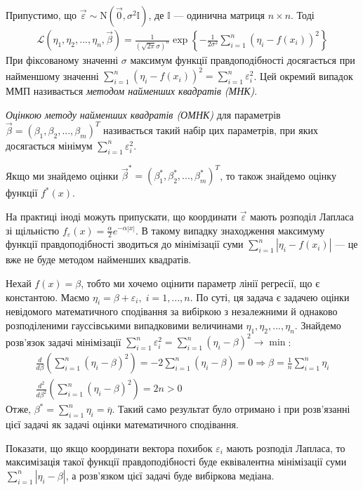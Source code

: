 Припустимо, що $\vec{\varepsilon} \sim \mathrm{N}(\vec{0}, \sigma^2 \mathbb{I})$, де
$\mathbb{I}$ --- одинична матриця $n\times n$. Тоді
\begin{gather*}
    \mathcal{L}\left(\eta_1, \eta_2, ..., \eta_n, \vec{\beta}\right) = 
    \frac{1}{\left(\sqrt{2\pi} \sigma\right)^n} \exp\left\{
        -\frac{1}{2\sigma^2} \sum_{i=1}^n (\eta_i - f(x_i))^2
        \right\}
\end{gather*}
При фіксованому значенні $\sigma$ максимум функції правдоподібності досягається
при найменшому значенні $\sum\limits_{i=1}^n (\eta_i - f(x_i))^2 = \sum\limits_{i=1}^n \varepsilon_i^2$.
Цей окремий випадок ММП називається \emph{методом найменших квадратів (МНК)}.
\begin{definition}
    \emph{Оцінкою методу найменших квадратів (ОМНК)} для параметрів $\vec{\beta} = (\beta_1, \beta_2, ..., \beta_m)^T$
    називається такий набір цих параметрів, при яких досягається мінімум $\sum\limits_{i=1}^n \varepsilon_i^2$.
\end{definition}
Якщо ми знайдемо оцінки $\vec{\beta}^* = (\beta_1^*, \beta_2^*, ..., \beta_m^*)^T$,
то також знайдемо оцінку функції $f^*(x)$.
\begin{remark}
    На практиці іноді можуть припускати, що координати $\vec{\varepsilon}$ мають 
    розподіл Лапласа зі щільністю $f_\varepsilon(x) = \frac{\alpha}{2} e^{-\alpha|x|}$.
    В такому випадку знаходження максимуму функції правдоподібності зводиться
    до мінімізації суми $\sum\limits_{i=1}^n |\eta_i - f(x_i)|$ --- це вже не буде
    методом найменших квадратів.
\end{remark}
\begin{example}\label{intercept_fit}
    Нехай $f(x) = \beta$, тобто ми хочемо оцінити параметр лінії регресії, що є константою.
    Маємо $\eta_i = \beta + \varepsilon_i, \; i = 1,...,n$. По суті, ця задача є задачею оцінки невідомого математичного сподівання
    за вибіркою з незалежними й однаково розподіленими гауссівськими випадковими величинами
    $\eta_1, \eta_2, ..., \eta_n$. Знайдемо розв'язок задачі мінімізації
    $\sum\limits_{i=1}^n \varepsilon_i^2 = \sum\limits_{i=1}^n (\eta_i - \beta)^2 \to \min$:
    \begin{gather*}
        \frac{d}{d\beta} \left(\sum\limits_{i=1}^n (\eta_i - \beta)^2\right) = 
        - 2 \sum\limits_{i=1}^n (\eta_i - \beta) = 0 \Rightarrow \beta = \frac{1}{n} \sum\limits_{i=1}^n \eta_i \\
        \frac{d^2}{d\beta^2} \left(\sum\limits_{i=1}^n (\eta_i - \beta)^2\right) = 2n > 0
    \end{gather*}
    Отже, $\beta^* = \sum\limits_{i=1}^n \eta_i = \overline{\eta}$. Такий само результат було
    отримано і при розв'язанні цієї задачі як задачі оцінки математичного сподівання.
\end{example}
\begin{exercise}
    Показати, що якщо координати вектора похибок $\varepsilon_i$ мають розподіл Лапласа, то максимізація
    такої функції правдоподібності буде еквівалентна мінімізації суми
    $\sum\limits_{i=1}^n |\eta_i - \beta|$, а розв'язком цієї задачі буде вибіркова медіана.
\end{exercise}

